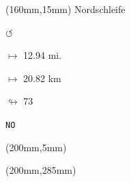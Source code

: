 \begin{textblock*}{40mm}(160mm,15mm)%
Nordschleife
\par \Huge$\circlearrowleft$
\Large
\par$\mapsto$ 12.94 mi.
\par$\mapsto$ 20.82 km
\par$\looparrowright$ 73
\par\hfill\tiny\tt NO\\
\end{textblock*}
\begin{textblock*}{20mm}(200mm,5mm)%
\fbox{\thepage}
\end{textblock*}
\begin{textblock*}{20mm}(200mm,285mm)%
\fbox{\thepage}
\end{textblock*}
\null\newpage

